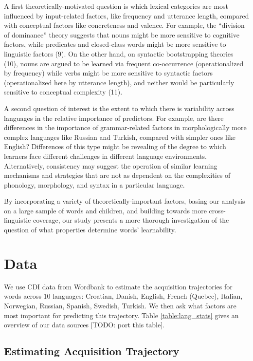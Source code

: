 \documentclass[9pt,twocolumn,twoside]{pnas-new}
\begin{document}
A first theoretically-motivated question is which lexical categories are
most influenced by input-related factors, like frequency and utterance
length, compared with conceptual factors like concreteness and valence.
For example, the ``division of dominance'' theory suggests that nouns
might be more sensitive to cognitive factors, while predicates and
closed-class words might be more sensitive to linguistic factors (9). On
the other hand, on syntactic bootstrapping theories (10), nouns are
argued to be learned via frequent co-occurrence (operationalized by
frequency) while verbs might be more sensitive to syntactic factors
(operationalized here by utterance length), and neither would be
particularly sensitive to conceptual complexity (11).

A second question of interest is the extent to which there is
variability across languages in the relative importance of predictors.
For example, are there differences in the importance of grammar-related
factors in morphologically more complex languages like Russian and
Turkish, compared with simpler ones like English? Differences of this
type might be revealing of the degree to which learners face different
challenges in different language environments. Alternatively,
consistency may suggest the operation of similar learning mechanisms and
strategies that are not as dependent on the complexities of phonology,
morphology, and syntax in a particular language.

By incorporating a variety of theoretically-important factors, basing
our analysis on a large sample of words and children, and building
towards more cross-linguistic coverage, our study presents a more
thorough investigation of the question of what properties determine
words' learnability.

\section*{Data}\label{data}

We use CDI data from Wordbank to estimate the acquisition trajectories
for words across 10 languages: Croatian, Danish, English, French
(Quebec), Italian, Norwegian, Russian, Spanish, Swedish, Turkish. We
then ask what factors are most important for predicting this trajectory.
Table \ref{table:lang_stats} gives an overview of our data sources
{[}TODO: port this table{]}.

\subsection{Estimating Acquisition
Trajectory}\label{estimating-acquisition-trajectory}
\end{document}
